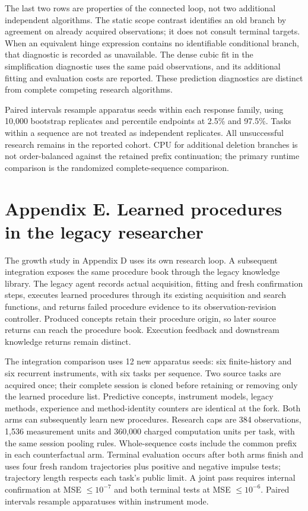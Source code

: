 \documentclass[twoside,11pt]{article}
\begin{document}
The last two rows are properties of the connected loop, not two additional
independent algorithms. The static scope contrast identifies an old branch by
agreement on already acquired observations; it does not consult terminal targets.
When an equivalent hinge expression contains no identifiable conditional branch,
that diagnostic is recorded as unavailable. The dense cubic fit in the
simplification diagnostic uses the same paid observations, and its additional
fitting and evaluation costs are reported. These prediction diagnostics are
distinct from complete competing research algorithms.


Paired intervals resample apparatus seeds within each response family, using
10,000 bootstrap replicates and percentile endpoints at 2.5\% and 97.5\%. Tasks
within a sequence are not treated as independent replicates. All unsuccessful
research remains in the reported cohort. CPU for additional deletion branches
is not order-balanced against the retained prefix continuation; the primary
runtime comparison is the randomized complete-sequence comparison.


\section*{Appendix E. Learned procedures in the legacy researcher}

The growth study in Appendix D uses its own research loop. A subsequent
integration exposes the same procedure book through the legacy knowledge library.
The legacy agent records actual acquisition, fitting and fresh confirmation
steps, executes learned procedures through its existing acquisition and search
functions, and returns failed procedure evidence to its observation-revision
controller. Produced concepts retain their procedure origin, so later source
returns can reach the procedure book. Execution feedback and downstream knowledge
returns remain distinct.


The integration comparison uses 12 new apparatus seeds: six finite-history and
six recurrent instruments, with six tasks per sequence. Two source tasks are
acquired once; their complete session is cloned before retaining or removing only
the learned procedure list. Predictive concepts, instrument models, legacy
methods, experience and method-identity counters are identical at the fork. Both
arms can subsequently learn new procedures. Research caps are 384 observations,
1,536 measurement units and 360,000 charged computation units per task, with the
same session pooling rules. Whole-sequence costs include the common prefix in
each counterfactual arm. Terminal evaluation occurs after both arms finish and
uses four fresh random trajectories plus positive and negative impulse tests;
trajectory length respects each task's public limit. A joint pass requires
internal confirmation at MSE \(\leq10^{-7}\) and both terminal tests at
MSE \(\leq10^{-6}\). Paired intervals resample apparatuses within instrument mode.
\end{document}
